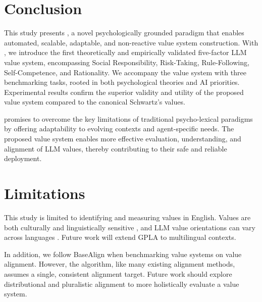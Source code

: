 \section{Conclusion}

This study presents \our{}, a novel psychologically grounded paradigm that enables automated, scalable, adaptable, and non-reactive value system construction. With \our{}, we introduce the first theoretically and empirically validated five-factor LLM value system, encompassing Social Responsibility, Risk-Taking, Rule-Following, Self-Competence, and Rationality. We accompany the value system with three benchmarking tasks, rooted in both psychological theories and AI priorities. Experimental results confirm the superior validity and utility of the proposed value system compared to the canonical Schwartz's values.

\our{} promises to overcome the key limitations of traditional psycho-lexical paradigms by offering adaptability to evolving contexts and agent-specific needs. The proposed value system enables more effective evaluation, understanding, and alignment of LLM values, thereby contributing to their safe and reliable deployment.


\section*{Limitations}

This study is limited to identifying and measuring values in English. Values are both culturally and linguistically sensitive \cite{schwartz2013culture}, and LLM value orientations can vary across languages \cite{cahyawijaya2024high}. Future work will extend GPLA to multilingual contexts.

In addition, we follow BaseAlign \cite{yao2023value_fulcra} when benchmarking value systems on value alignment. However, the algorithm, like many existing alignment methods, assumes a single, consistent alignment target. Future work should explore distributional and pluralistic alignment \cite{sorensenposition, zhong2024panacea} to more holistically evaluate a value system.